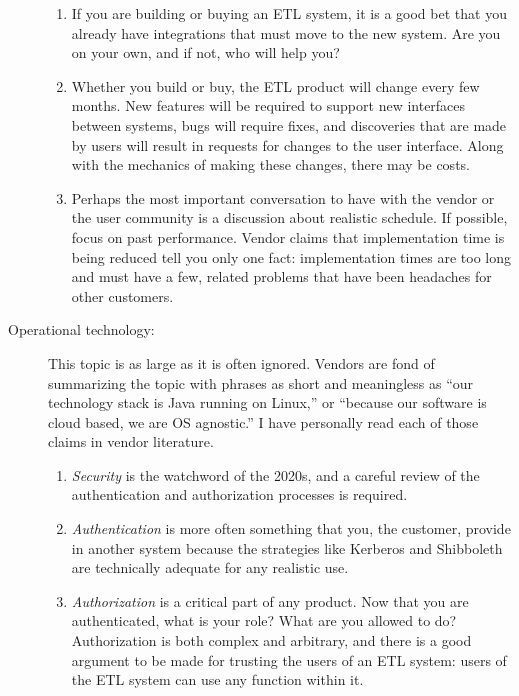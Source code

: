\documentclass[11pt,letterpaper,twosided]{memoir}
\begin{document}
\begin{description}
\begin{enumerate}
\item If you are building or buying an ETL system, it is a good
bet that you already have integrations that must move to the new
system. Are you on your own, and if not, who will help you?

\item Whether you build or buy, the ETL product will change every
few months. New features will be required to support new interfaces
between systems, bugs will require fixes, and discoveries that are
made by users will result in requests for changes to the user
interface. Along with the mechanics of making these changes,
there may be costs.

\item Perhaps the most important conversation to have with the
vendor or the user community is a discussion about realistic
schedule. If possible, focus on past performance. Vendor claims
that implementation time is being reduced tell you only one
fact: implementation times are too long and must have a 
few, related problems that have been headaches for other 
customers.

\end{enumerate}

\item[Operational technology:] This topic is as large as it is often
ignored. Vendors are fond of summarizing the topic with phrases as
short and meaningless as ``our technology stack is Java running on 
Linux,'' or ``because our software is cloud based, we are OS agnostic.''
I have personally read each of those claims in vendor literature.

\begin{enumerate}
\item \emph{Security} is the watchword of the 2020s, and a careful
review of the authentication and authorization processes is required.

\item \emph{Authentication} is more often something that you, the
customer, provide in another system because the strategies like
Kerberos and Shibboleth are technically adequate for any realistic
use.

\item \emph{Authorization} is a critical part of any product. 
Now that you are authenticated, what is your role? What are you allowed
to do? Authorization is both complex and arbitrary, and there is
a good argument to be made for trusting the users of an ETL 
system: users of the ETL system can use any function within it.


\end{enumerate}
\end{description}
\end{document}
